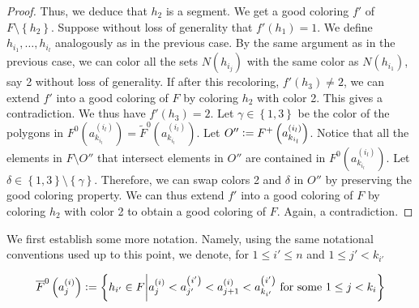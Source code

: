 \documentclass[12pt]{article}
\theoremstyle{definition}
\newcommand{\defeq}{\vcentcolon=}
\begin{document}
\begin{proof}
         Thus, we deduce that $h_2$ is a segment.
         We get a good coloring $f'$ of
         $F \setminus \left\{h_2\right\}$.
         Suppose without loss of generality
         that $f'\left(h_1\right) = 1$.
         We define $h_{i_1}, \ldots, h_{i_{l}}$ 
         analogously as in the previous case.
         By the same argument as in the previous case,
         we can color all the sets 
         $N\left(h_{i_{j}}\right)$ with the
         same color as $N\left(h_{i_1}\right)$,
         say 2 without loss of generality.
         If after this recoloring,
         $f'\left(h_3\right) \neq 2$, 
         we can extend $f'$ into a
         good coloring of $F$ by 
         coloring $h_2$ with color 2.
         This gives a contradiction.
         We thus have $f'\left(h_3\right) = 2$.
         Let $\gamma \in \left\{1, 3\right\}$
         be the color of the polygons
         in $F^{0}\left(a_{k_{i_{l}}}^{\left(i_{l}\right)}\right)
         = \widetilde{F}^{0}\left(
         a_{k_{i_{l}}}^{\left(i_{l}\right)}\right)$.
         Let $O'' \defeq F^{+}\left(
         a_{k_{i_{l}}}^{\left(i_{l}\right)}\right)$.
         Notice that all the elements
         in $F \setminus O''$ 
         that intersect elements in $O''$
         are contained in $F^{0}\left(
         a_{k_{i_{l}}}^{\left(i_{l}\right)}\right)$.
         Let $\delta \in \left\{1, 3\right\}
         \setminus \left\{\gamma\right\}$.
         Therefore, we can swap colors
         2 and $\delta$ in $O''$
         by preserving the good coloring property.
         We can thus extend $f'$ into a
         good coloring of $F$ by
         coloring $h_2$ with color 2
         to obtain a good coloring of $F$.
         Again, a contradiction.
     \end{proof}

     We first establish some more notation.
     Namely, using the same notational conventions
     used up to this point, we denote, for
     $1 \leq i' \leq n$ and $1 \leq j' < k_{i'}$

     \begin{gather*}
         \overline{F}^{0}\left(a_{j}^{\left(i\right)}\right) \defeq
         \left\{h_{i'} \in F \middle| 
         a_{j}^{\left(i\right)} <
         a_{j'}^{\left(i'\right)} <
         a_{j+1}^{\left(i\right)} <
         a_{k_{i'}}^{\left(i'\right)}
         \text{ for some }
         1 \leq j < k_{i}\right\}
     \end{gather*}
\end{document}
